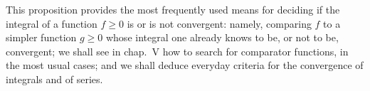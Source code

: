 This proposition provides the most frequently used means for deciding if the integral of a function \(f \geqslant 0\) is or is not convergent: namely, comparing \(f\) to a simpler function \(g \geqslant 0\) whose integral one already knows to be, or not to be, convergent; we shall see in chap.~V how to search for comparator functions, in the most usual cases; and we shall deduce everyday criteria for the convergence of integrals and of series.

